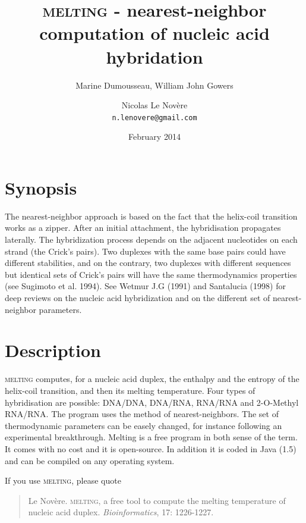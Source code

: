 \documentclass{article}
\begin{document}
\title{\textsc{melting} - nearest-neighbor computation of nucleic acid hybridation}
\author{Marine Dumousseau, William John Gowers \and Nicolas Le Nov\`ere \\
  \texttt{n.lenovere@gmail.com}}
\date{February 2014}
\maketitle

\newpage

\tableofcontents

\newpage

\nocite{*}

\section{Synopsis}
The nearest-neighbor approach is based on the fact that the helix-coil
transition works as a zipper. After an initial attachment, the hybridisation
propagates laterally.
The hybridization process depends on the adjacent nucleotides on each strand (the Crick's pairs).  
Two duplexes with the same base pairs could have different stabilities, and on the contrary, two 
duplexes with different sequences but identical sets of Crick's pairs will have the same
thermodynamics properties (see Sugimoto et al. 1994).
See Wetmur J.G (1991) and Santalucia (1998) for deep reviews on the nucleic acid hybridization
and on the different set of nearest-neighbor parameters.
 
\section{Description }

\textsc{melting} computes, for a nucleic acid duplex, the enthalpy and the
entropy of the helix-coil transition, and then its melting temperature. Four
types of hybridisation are possible: DNA/DNA, DNA/RNA, RNA/RNA and 2-O-Methyl RNA/RNA. The program
uses the method of nearest-neighbors. The set of thermodynamic parameters can be
easely changed, for instance following an experimental breakthrough. Melting is
a free program in both sense of the term. It comes with no cost and it is
open-source. In addition it is coded in Java (1.5) and can be compiled on any
operating system.


If you use \textsc{melting}, please quote

\begin{quote}
  Le Nov\`ere. \textsc{melting}, a free tool to compute the
    melting temperature of nucleic acid duplex. \emph{Bioinformatics}, 17: 1226-1227. 
\end{quote}
\end{document}
